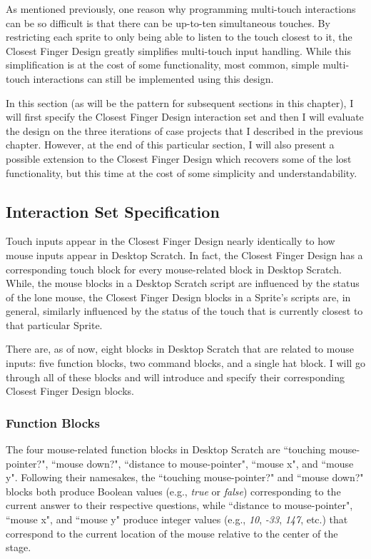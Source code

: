 As mentioned previously, one reason why programming multi-touch interactions can be so difficult is that there can be up-to-ten simultaneous touches. By restricting each sprite to only being able to listen to the touch closest to it, the Closest Finger Design greatly simplifies multi-touch input handling. While this simplification is at the cost of some functionality, most common, simple multi-touch interactions can still be implemented using this design. 

In this section (as will be the pattern for subsequent sections in this chapter), I will first specify the Closest Finger Design interaction set and then I will evaluate the design on the three iterations of case projects that I described in the previous chapter. However, at the end of this particular section, I will also present a possible extension to the Closest Finger Design which recovers some of the lost functionality, but this time at the cost of some simplicity and understandability.

\subsection{Interaction Set Specification}

Touch inputs appear in the Closest Finger Design nearly identically to how mouse inputs appear in Desktop Scratch. In fact, the Closest Finger Design has a corresponding touch block for every mouse-related block in Desktop Scratch. While, the mouse blocks in a Desktop Scratch script are influenced by the status of the lone mouse,  the Closest Finger Design blocks in a Sprite's scripts are, in general, similarly influenced by the status of the touch that is currently closest to that particular Sprite. 

There are, as of now, eight blocks in Desktop Scratch that are related to mouse inputs: five function blocks, two command blocks, and a single hat block. I will go through all of these blocks and will introduce and specify their corresponding Closest Finger Design blocks.

\subsubsection{Function Blocks}
The four mouse-related function blocks in Desktop Scratch are ``touching mouse-pointer?", ``mouse down?", ``distance to mouse-pointer", ``mouse x", and ``mouse y". Following their namesakes, the ``touching mouse-pointer?" and ``mouse down?" blocks both produce Boolean values (e.g., \emph{true} or \emph{false}) corresponding to the current answer to their respective questions, while ``distance to mouse-pointer", ``mouse x", and ``mouse y" produce integer values (e.g., \emph{10}, \emph{-33}, \emph{147}, etc.) that correspond to the current location of the mouse relative to the center of the stage. 

